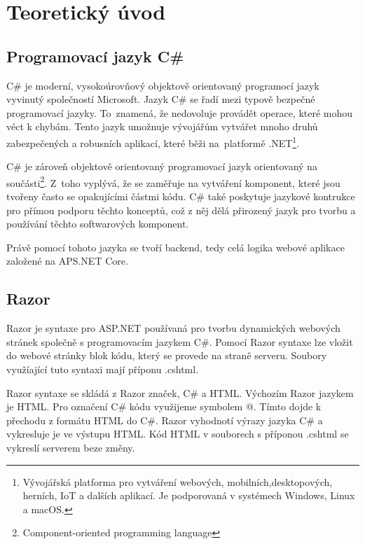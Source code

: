 \documentclass[a4paper, 12pt]{report}
\begin{document}
	\chapter{Teoretický úvod}

	\section{Programovací jazyk C\#}
	C\# je moderní, vysokoúrovňový objektově orientovaný programocí jazyk vyvinutý společností Microsoft. Jazyk C\# se řadí mezi typově bezpečné programovací jazyky. To~znamená, že nedovoluje provádět operace, které mohou véct k chybám. Tento jazyk umožnuje vývojářům vytvářet mnoho druhů zabezpečených a robusních aplikací, které běži na~platformě .NET\footnote{Vývojářská platforma pro vytváření webových, mobilních,desktopových, herních, IoT a dalších aplikací. Je podporovaná v systémech Windows, Linux a macOS.}.\par
	C\# je zároveň objektově orientovaný programovací jazyk orientovaný na součásti\footnote{Component-oriented programming language}. Z~toho vyplývá, že se zaměřuje na vytváření komponent, které jsou tvořeny často se opakujícími částmi kódu. C\# také poskytuje jazykové kontrukce pro přímou podporu těchto konceptů, což z něj dělá přirozený jazyk pro tvorbu a používání těchto softwarových komponent.\cite{CSharp}\par
		Právě pomocí tohoto jazyka se tvoří backend, tedy celá logika webové aplikace založené na APS.NET Core.
	\section{Razor}
	Razor je syntaxe pro ASP.NET používaná pro tvorbu dynamických webových stránek společně s programovacím jazykem C\#. Pomocí Razor syntaxe lze vložit do webové stránky blok kódu, který se provede na straně serveru. Soubory využíající tuto syntaxi mají příponu .cshtml.\par
	Razor syntaxe se skládá z Razor značek, C\# a HTML. Výchozím Razor jazykem je HTML. Pro označení C\# kódu využijeme symbolem @. Tímto dojde k přechodu z formátu HTML do C\#. Razor vyhodnotí výrazy jazyka C\# a vykresluje je ve výstupu HTML. Kód HTML v souborech s příponou .cshtml se vykreslí serverem beze změny.\cite{Razor}
\end{document}
